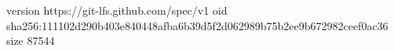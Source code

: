 version https://git-lfs.github.com/spec/v1
oid sha256:111102d290b403e840448afba6b39d5f2d062989b75b2ee9b672982ceef0ac36
size 87544
